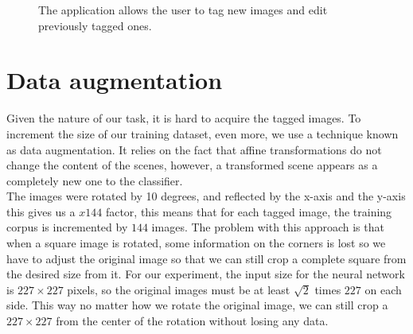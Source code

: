 \begin{figure}[h]
  \begin{center}
  \end{center}
  \label{fig:tag}
  \caption{The application allows the user to tag new images and edit previously tagged ones.}
\end{figure}


\section{Data augmentation}

Given the nature of our task, it is hard to acquire the tagged images. To increment the size of our training dataset, even more, we use a technique known as data augmentation. It relies on the fact that affine transformations do not change the content of the scenes, however, a transformed scene appears as a completely new one to the classifier.\\

The images were rotated by 10 degrees, and reflected by the x-axis and the y-axis this gives us a $x144$ factor, this means that for each tagged image, the training corpus is incremented by $144$ images. The problem with this approach is that when a square image is rotated, some information on the corners is lost so we have to adjust the original image so that we can still crop a complete square from the desired size from it. For our experiment, the input size for the neural network is $227\times 227$ pixels, so the original images must be at least $\sqrt{2}$ times $227$ on each side. This way no matter how we rotate the original image, we can still crop a $227\times 227$ from the center of the rotation without losing any data.\\



